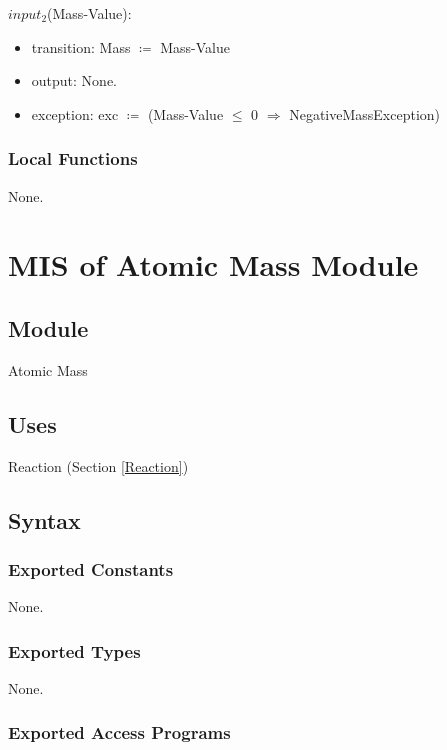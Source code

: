 \documentclass[12pt, titlepage]{article}
\begin{document}
\noindent $input_2$(Mass-Value):
\begin{itemize}
\item transition: Mass  $\coloneqq$ Mass-Value
\item output:  None.
\item exception: exc $\coloneqq$ (Mass-Value $\leq$ 0 $\Rightarrow$  NegativeMassException)
\end{itemize}

\subsubsection{Local Functions}
 
None.



\newpage

\section{MIS of Atomic Mass Module} \label{Atomic Mass} 

\subsection{Module}

Atomic Mass

\subsection{Uses}

Reaction (Section \ref{Reaction})

\subsection{Syntax}

\subsubsection{Exported Constants}

None.

\subsubsection{Exported Types}

None.


\subsubsection{Exported Access Programs}
\end{document}
